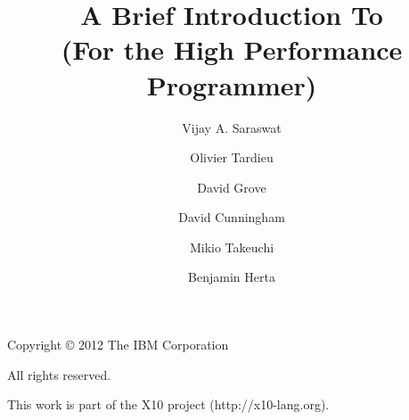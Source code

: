 
\thispagestyle{empty}

\title{A Brief Introduction To \Xten \\
(For the High Performance Programmer)}
\author{Vijay A. Saraswat \and
Olivier Tardieu \and
David Grove \and
David Cunningham \and
Mikio Takeuchi \and
Benjamin Herta
}
\maketitle

\newpage
\vspace*{5in}
Copyright \copyright{} 2012 The IBM Corporation

All rights reserved.

This work is part of the X10 project (http://x10-lang.org).
